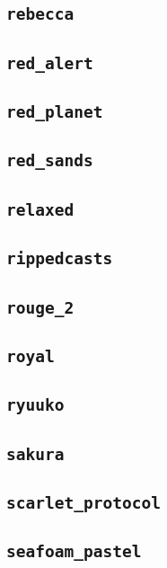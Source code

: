 \subsection{\texttt{rebecca}}
\newpage
\subsection{\texttt{red\_alert}}
\newpage
\subsection{\texttt{red\_planet}}
\newpage
\subsection{\texttt{red\_sands}}
\newpage
\subsection{\texttt{relaxed}}
\newpage
\subsection{\texttt{rippedcasts}}
\newpage
\subsection{\texttt{rouge\_2}}
\newpage
\subsection{\texttt{royal}}
\newpage
\subsection{\texttt{ryuuko}}
\newpage
\subsection{\texttt{sakura}}
\newpage
\subsection{\texttt{scarlet\_protocol}}
\newpage
\subsection{\texttt{seafoam\_pastel}}
\newpage
